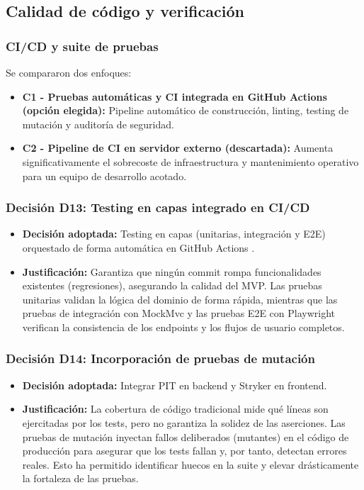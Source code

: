 \FloatBarrier
\subsection{Calidad de c\'odigo y verificaci\'on}

\subsubsection*{CI/CD y suite de pruebas}
Se compararon dos enfoques:
\begin{itemize}
    \item \textbf{C1 - Pruebas autom\'aticas y CI integrada en GitHub Actions (opci\'on elegida):} Pipeline autom\'atico de construcci\'on, linting, testing de mutaci\'on y auditor\'ia de seguridad.
    \item \textbf{C2 - Pipeline de CI en servidor externo (descartada):} Aumenta significativamente el sobrecoste de infraestructura y mantenimiento operativo para un equipo de desarrollo acotado.
\end{itemize}

\subsubsection*{Decisi\'on D13: Testing en capas integrado en CI/CD}
\begin{itemize}
    \item \textbf{Decisi\'on adoptada:} Testing en capas (unitarias, integraci\'on y E2E) orquestado de forma autom\'atica en GitHub Actions \cite{githubactions}.
    \item \textbf{Justificaci\'on:} Garantiza que ning\'un commit rompa funcionalidades existentes (regresiones), asegurando la calidad del MVP. Las pruebas unitarias validan la l\'ogica del dominio de forma r\'apida, mientras que las pruebas de integraci\'on con MockMvc y las pruebas E2E con Playwright \cite{playwrightdocs} verifican la consistencia de los endpoints y los flujos de usuario completos.
\end{itemize}

\subsubsection*{Decisi\'on D14: Incorporaci\'on de pruebas de mutaci\'on}
\begin{itemize}
    \item \textbf{Decisi\'on adoptada:} Integrar PIT \cite{pitest} en backend y Stryker \cite{stryker} en frontend.
    \item \textbf{Justificaci\'on:} La cobertura de c\'odigo tradicional mide qu\'e l\'ineas son ejercitadas por los tests, pero no garantiza la solidez de las aserciones. Las pruebas de mutaci\'on inyectan fallos deliberados (mutantes) en el c\'odigo de producci\'on para asegurar que los tests fallan y, por tanto, detectan errores reales. Esto ha permitido identificar huecos en la suite y elevar dr\'asticamente la fortaleza de las pruebas.
\end{itemize}

